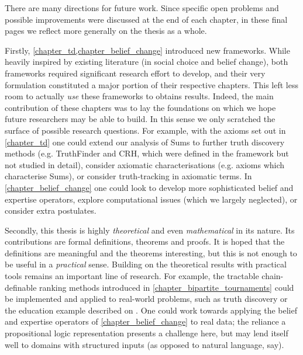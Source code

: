 There are many directions for future work. Since specific open problems and
possible improvements were discussed at the end of each chapter, in these final
pages we reflect more generally on the thesis as a whole.

Firstly, \cref{chapter_td,chapter_belief_change} introduced new frameworks.
While heavily inspired by existing literature (in social choice and belief
change), both frameworks required significant research effort to develop, and
their very formulation constituted a major portion of their respective
chapters. This left less room to actually \emph{use} these frameworks to
obtains results. Indeed, the main contribution of these chapters was to lay the
foundations on which we hope future researchers may be able to build. In this
sense we only scratched the surface of possible research questions.
%
For example, with the axioms set out in \cref{chapter_td} one could extend our
analysis of Sums to further truth discovery methods (e.g. TruthFinder and CRH,
which were defined in the framework but not studied in detail), consider
axiomatic characterisations (e.g. axioms which characterise Sums), or consider
truth-tracking in axiomatic terms. In \cref{chapter_belief_change} one could
look to develop more sophisticated belief and expertise operators, explore
computational issues (which we largely neglected), or consider extra
postulates.

Secondly, this thesis is highly \emph{theoretical} and even \emph{mathematical}
in its nature. Its contributions are formal definitions, theorems and proofs.
It is hoped that the definitions are meaningful and the theorems interesting,
but this is not enough to be useful in a \emph{practical} sense. Building on
the theoretical results with practical tools remains an important line of
research. For example, the tractable chain-definable ranking methods introduced
in \cref{chapter_bipartite_tournaments} could be implemented and applied to
real-world problems, such as truth discovery or the education example described
on . One could work towards applying the
belief and expertise operators of \cref{chapter_belief_change} to real data;
the reliance a propositional logic representation presents a challenge here,
but may lend itself well to domains with structured inputs (as opposed to
natural language, say).

